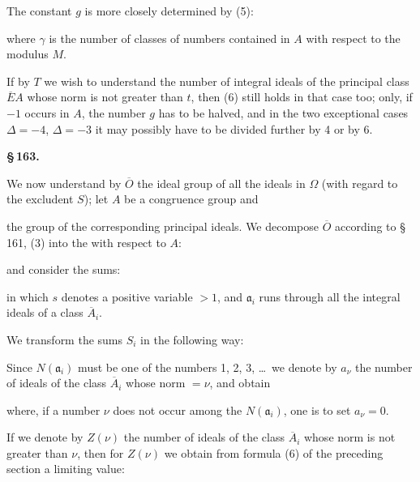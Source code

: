 
The constant $g$ is more closely determined by (5):


where $\gamma$ is the number of classes of numbers contained in $A$ with respect to the modulus $M$.

If by $T$ we wish to understand the number of integral ideals of the principal class $\overline{E}A$ whose norm is not greater than $t$, then (6) still holds in that case too; only, if $-1$ occurs in $A$, the number $g$ has to be halved, and in the two exceptional cases $\Delta = -4$, $\Delta = -3$ it may possibly have to be divided further by 4 or by 6.

\begin{center}
\textbf{\S\,163.\qquad {}}
\end{center}

We now understand by $\overline{O}$ the ideal group of all the ideals in $\Omega$ (with regard to the excludent $S$); let $A$ be a congruence group and


the group of the corresponding principal ideals. We decompose $\overline{O}$ according to \S\,161, (3) into the  with respect to $A$:


and consider the sums:


in which $s$ denotes a positive variable $> 1$, and $\mathfrak{a}_i$ runs through all the integral ideals of a class $\overline{A}_i$.

We transform the sums $S_i$ in the following way:

Since $N(\mathfrak{a}_i)$ must be one of the numbers 1, 2, 3, \dots\ we denote by $a_\nu$ the number of ideals of the class $\overline{A}_i$ whose norm $= \nu$, and obtain


where, if a number $\nu$ does not occur among the $N(\mathfrak{a}_i)$, one is to set $a_\nu = 0$.

If we denote by $Z(\nu)$ the number of ideals of the class $\overline{A}_i$ whose norm is not greater than $\nu$, then for $Z(\nu)$ we obtain from formula (6) of the preceding section a limiting value:
